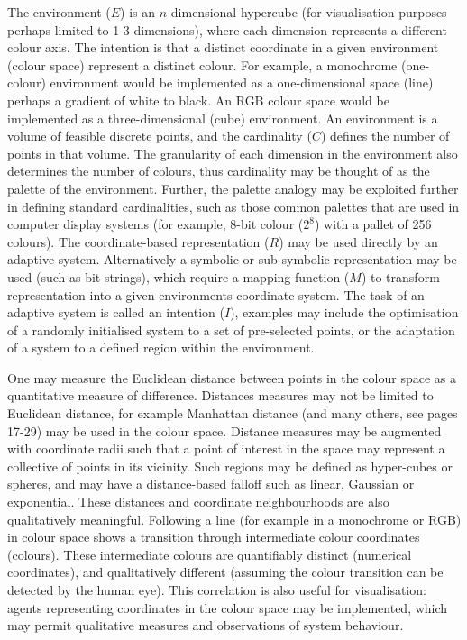 The environment ($E$) is an $n$-dimensional hypercube (for visualisation purposes perhaps limited to 1-3 dimensions), where each dimension represents a different colour axis. The intention is that a distinct coordinate in a given environment (colour space) represent a distinct colour. For example, a monochrome (one-colour) environment would be implemented as a one-dimensional space (line) perhaps a gradient of white to black. An RGB colour space would be implemented as a three-dimensional (cube) environment. An environment is a volume of feasible discrete points, and the cardinality ($C$) defines the number of points in that volume. The granularity of each dimension in the environment also determines the number of colours, thus cardinality may be thought of as the palette of the environment. Further, the palette analogy may be exploited further in defining standard cardinalities, such as those common palettes that are used in computer display systems (for example, 8-bit colour ($2^{8}$) with a pallet of 256 colours). The coordinate-based representation ($R$) may be used directly by an adaptive system. Alternatively a symbolic or sub-symbolic representation may be used (such as bit-strings), which require a mapping function ($M$) to transform representation into a given environments coordinate system. 
The task of an adaptive system is called an intention ($I$), examples may include the optimisation of a randomly initialised system to a set of pre-selected points, or the adaptation of a system to a defined region within the environment.

One may measure the Euclidean distance between points in the colour space as a quantitative measure of difference. Distances measures may not be limited to Euclidean distance, for example Manhattan distance (and many others, see \cite{Kohonen2001} pages 17-29) may be used in the colour space. Distance measures may be augmented with coordinate radii such that a point of interest in the space may represent a collective of points in its vicinity. Such regions may be defined as hyper-cubes or spheres, and may have a distance-based falloff such as linear, Gaussian or exponential. These distances and coordinate neighbourhoods are also qualitatively meaningful. Following a line (for example in a monochrome or RGB) in colour space shows a transition through intermediate colour coordinates (colours). These intermediate colours are quantifiably distinct (numerical coordinates), and qualitatively different (assuming the colour transition can be detected by the human eye). This correlation is also useful for visualisation: agents representing coordinates in the colour space may be implemented, which may permit qualitative measures and observations of system behaviour. 

